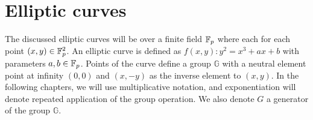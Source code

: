 


\section{Elliptic curves}
The discussed elliptic curves will be over a finite field $\mathbb{F}_p$ where each for each point $(x, y) \in \mathbb{F}_p^2$. An elliptic curve is defined as $f(x,y): y^2 = x^3 + ax + b$ with parameters $a, b \in \mathbb{F}_p$. Points of the curve define a group $\mathbb{G}$ with a neutral element point at infinity $(0, 0)$ and $(x, -y)$ as the inverse element to $(x, y)$. In the following chapters, we will use multiplicative notation, and exponentiation will denote repeated application of the group operation.  We also denote $G$ a generator of the group $\mathbb{G}$. 

